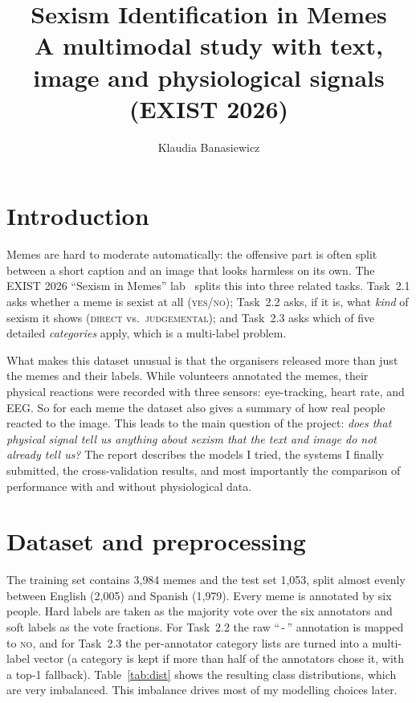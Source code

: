 \documentclass[11pt,a4paper]{article}
\title{\textbf{Sexism Identification in Memes}\\[2pt]
\large A multimodal study with text, image and physiological signals (EXIST 2026)}
\author{Klaudia Banasiewicz}
\date{}
\begin{document}
\maketitle
\vspace{-1.2em}

\section{Introduction}
Memes are hard to moderate automatically: the offensive part is often split between a short
caption and an image that looks harmless on its own. The EXIST 2026 ``Sexism in Memes'' lab~\cite{exist}
splits this into three related tasks. Task~2.1 asks whether a meme is sexist at all
(\textsc{yes}/\textsc{no}); Task~2.2 asks, if it is, what \emph{kind} of sexism it shows
(\textsc{direct} vs.\ \textsc{judgemental}); and Task~2.3 asks which of five detailed
\emph{categories} apply, which is a multi-label problem.

What makes this dataset unusual is that the organisers released more than just the memes and
their labels. While volunteers annotated the memes, their physical reactions were recorded with
three sensors: eye-tracking, heart rate, and EEG. So for each meme the dataset also gives a
summary of how real people reacted to the image. This leads to the main question of the project:
\emph{does that physical signal tell us anything about sexism that the text and image do not
already tell us?} The report describes the models I tried, the systems I finally submitted, the
cross-validation results, and most importantly the comparison of performance with and without
physiological data.

\section{Dataset and preprocessing}
The training set contains 3{,}984 memes and the test set 1{,}053, split almost evenly between
English (2{,}005) and Spanish (1{,}979). Every meme is annotated by six people. Hard labels are
taken as the majority vote over the six annotators and soft labels as the vote fractions. For
Task~2.2 the raw ``\,-\,'' annotation is mapped to
\textsc{no}, and for Task~2.3 the per-annotator category lists are turned into a multi-label
vector (a category is kept if more than half of the annotators chose it, with a top-1 fallback).
Table~\ref{tab:dist} shows the resulting class distributions, which are very imbalanced. This
imbalance drives most of my modelling choices later.
\end{document}
